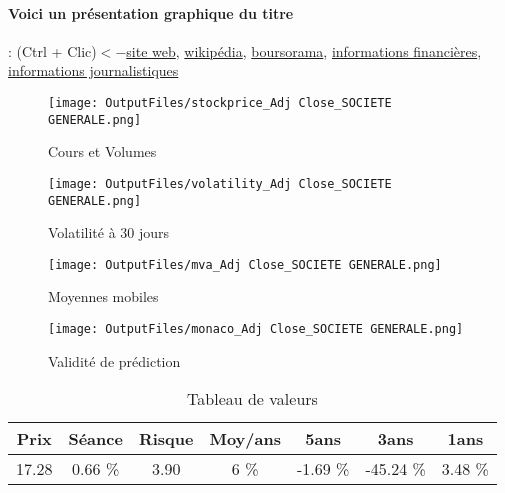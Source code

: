 \documentclass[11pt,a4paper]{report}%
\begin{document}
\paragraph{Voici un présentation graphique du titre} : (Ctrl + Clic)$<-$\href{https://m.societegenerale.com/fr/investisseurs}{site web}, \href{https://fr.wikipedia.org/wiki/Soci%C3%A9t%C3%A9_g%C3%A9n%C3%A9rale}{wikipédia}, \href{https://www.boursorama.com/cours/1rPGLE}{boursorama}, \href{https://www.qwant.com/?q=site:https:%2f%2fwww.easybourse.com%2faction-societe%2fSOCIETE-GENERALE&t=web&client=ext-firefox-hp}{informations financières}, \href{https://bourse.lerevenu.com/cours-de-bourse/fiche-valeur-synthese/SOCIETE-GENERALE/GLE-FR}{informations journalistiques}
\begin{figure}[!htb]
   \begin{minipage}{0.5\textwidth}
     \centering
     \texttt{[image: OutputFiles/stockprice\_Adj Close\_SOCIETE GENERALE.png]}
     \caption{Cours et Volumes}\label{Fig:price_SOCIETE GENERALE}
   \end{minipage}\hfill
   \begin{minipage}{0.5\textwidth}
     \centering
     \texttt{[image: OutputFiles/volatility\_Adj Close\_SOCIETE GENERALE.png]}
     \caption{Volatilité à 30 jours}\label{Fig:volat_SOCIETE GENERALE}
   \end{minipage}
\end{figure}
\begin{figure}[!htb]
   \begin{minipage}{0.5\textwidth}
     \centering
     \texttt{[image: OutputFiles/mva\_Adj Close\_SOCIETE GENERALE.png]}
     \caption{Moyennes mobiles}\label{Fig:mva_SOCIETE GENERALE}
   \end{minipage}\hfill
   \begin{minipage}{0.5\textwidth}
     \centering
     \texttt{[image: OutputFiles/monaco\_Adj Close\_SOCIETE GENERALE.png]}
     \caption{Validité de prédiction}\label{Fig:prediction_SOCIETE GENERALE}
   \end{minipage}
\end{figure}

\begin{table}[H]
  \centering
    \begin{tabular}{|c|c|c|c|c|c|c|}
    \hline
    Prix & Séance & Risque  & Moy/ans & 5ans & 3ans & 1ans \\
    \hline
    17.28 &    0.66 \%    & 3.90 & 6 \% & -1.69 \% & -45.24 \% & 3.48 \% \\
    \hline
    \end{tabular}%
        \label{tab:table_SOCIETE GENERALE}%
      \caption{Tableau de valeurs}
\end{table}%
\end{document}
